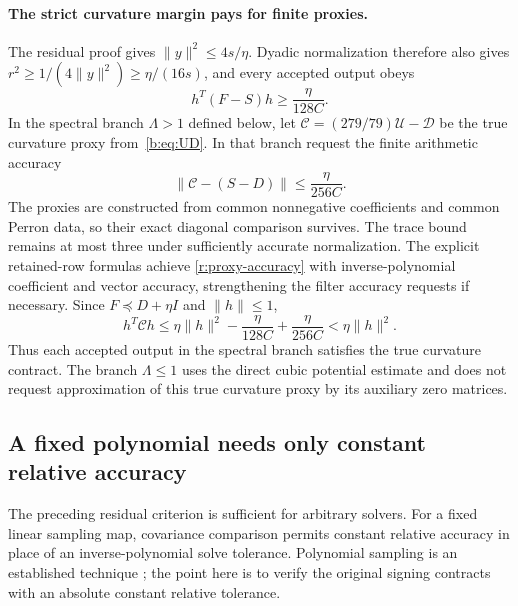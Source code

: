 \documentclass[11pt]{amsart}
\theoremstyle{definition}\newtheorem{definition}[theorem]{Definition}
\theoremstyle{remark}\newtheorem{remark}[theorem]{Remark}
\numberwithin{equation}{section}
\begin{document}
\paragraph{The strict curvature margin pays for finite proxies.}
The residual proof gives $\|y\|^2\le4s/\eta$. Dyadic normalization therefore
also gives $r^2\ge1/(4\|y\|^2)\ge\eta/(16s)$, and every accepted output obeys
\[
 h^T(F-S)h\ge\frac{\eta}{128C}.
\]
In the spectral branch $\Lambda>1$ defined below, let
$\mathcal C=(279/79)\mathcal U-\mathcal D$ be the true curvature proxy
from~\eqref{b:eq:UD}. In that branch request the finite arithmetic accuracy
\begin{equation}\label{r:proxy-accuracy}
 \|\mathcal C-(S-D)\|\le\frac{\eta}{256C}.
\end{equation}
The proxies are constructed from common nonnegative coefficients and
common Perron data, so their exact diagonal comparison survives.
The trace bound remains at most three under sufficiently accurate
normalization. The explicit retained-row formulas achieve
\eqref{r:proxy-accuracy} with inverse-polynomial coefficient and vector
accuracy, strengthening the filter accuracy requests if necessary.
Since $F\preceq D+\eta I$ and $\|h\|\le1$,
\[
 h^T\mathcal C h
 \le\eta\|h\|^2-\frac{\eta}{128C}+\frac{\eta}{256C}
 <\eta\|h\|^2.
\]
Thus each accepted output in the spectral branch satisfies the true
curvature contract. The branch
$\Lambda\le1$ uses the direct cubic potential estimate and does not request
approximation of this true curvature proxy by its auxiliary zero matrices.


\subsection{A fixed polynomial needs only constant relative accuracy}
\label{new:polynomial}
The preceding residual criterion is sufficient for arbitrary solvers.
For a fixed linear sampling map, covariance comparison permits constant
relative accuracy in place of an inverse-polynomial solve tolerance. Polynomial sampling is an established technique
\cite{ChebSample}; the point here is to verify the original signing
contracts with an absolute constant relative tolerance.
\end{document}
